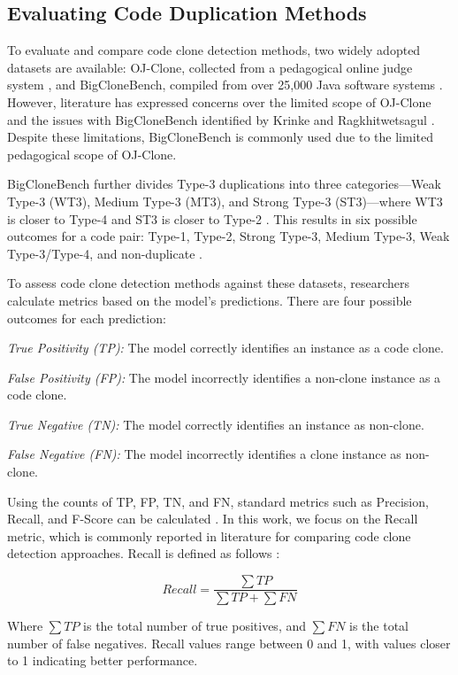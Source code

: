 \subsection{Evaluating Code Duplication Methods}

\label{subsec:codemethods}

To evaluate and compare code clone detection methods, two widely adopted
datasets are available: OJ-Clone, collected from a pedagogical online judge
system \citep{ojclone}, and BigCloneBench, compiled from over 25,000 Java
software systems \citep{bigclonebench}. However, literature has expressed
concerns over the limited scope of OJ-Clone and the issues with BigCloneBench
identified by Krinke and Ragkhitwetsagul \citep{bigfail}. Despite these
limitations, BigCloneBench is commonly used due to the limited pedagogical
scope of OJ-Clone.

BigCloneBench further divides Type-3 duplications into three categories—Weak
Type-3 (WT3), Medium Type-3 (MT3), and Strong Type-3 (ST3)—where WT3 is closer
to Type-4 and ST3 is closer to Type-2 \citep{bigclonebench}. This results in
six possible outcomes for a code pair: Type-1, Type-2, Strong Type-3, Medium
Type-3, Weak Type-3/Type-4, and non-duplicate \citep{bigclonebench}.

To assess code clone detection methods against these datasets, researchers
calculate metrics based on the model’s predictions. There are four possible
outcomes for each prediction:

\begin{itemize}
    \begin{item}
        \textit{True Positivity (TP):} The model correctly identifies an instance as a code clone.
    \end{item}
    \begin{item}
        \textit{False Positivity (FP):} The model incorrectly identifies a non-clone instance as a code clone.
    \end{item}
    \begin{item}
        \textit{True Negative (TN):} The model correctly identifies an instance as non-clone.
    \end{item}
    \begin{item}
        \textit{False Negative (FN):} The model incorrectly identifies a clone instance as non-clone.
    \end{item}
\end{itemize}

Using the counts of TP, FP, TN, and FN, standard metrics such as Precision,
Recall, and F-Score can be calculated \citep{recall}. In this work, we focus on
the Recall metric, which is commonly reported in literature for comparing code
clone detection approaches. Recall is defined as follows \citep{recall}:

$$Recall = \frac{\sum TP}{\sum TP + \sum FN }$$

Where $\sum TP$ is the total number of true positives, and $\sum FN$ is the
total number of false negatives. Recall values range between 0 and 1, with
values closer to 1 indicating better performance.

